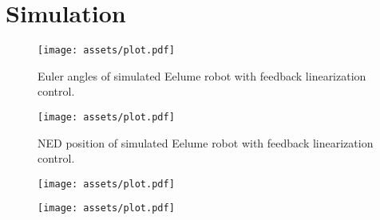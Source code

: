 \chapter{Simulation}

\begin{figure}[h]
    \centering
    \texttt{[image: assets/plot.pdf]}
    \caption{Euler angles of simulated Eelume robot with feedback linearization control.}
    \label{fig:plot}
\end{figure}

\begin{figure}[h]
    \centering
    \texttt{[image: assets/plot.pdf]}
    \caption{NED position of simulated Eelume robot with feedback linearization control.}
    \label{fig:plot2}
\end{figure}

\begin{figure}[h]
    \centering
    \texttt{[image: assets/plot.pdf]}
    \caption{}
    \label{fig:plot3}
\end{figure}

\begin{figure}[h]
    \centering
    \texttt{[image: assets/plot.pdf]}
    \caption{}
    \label{fig:plot4}
\end{figure}

